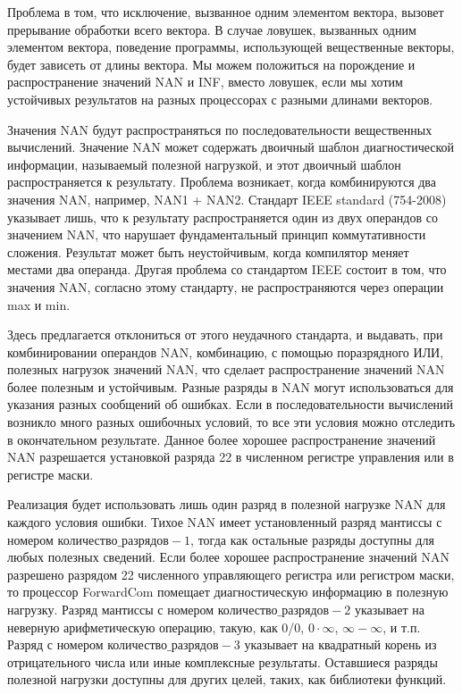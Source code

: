 \documentclass[forwardcom.tex]{subfiles}
\begin{document}
Проблема в том, что исключение, вызванное одним элементом вектора, вызовет прерывание обработки всего вектора. В случае ловушек, вызванных одним элементом вектора, поведение программы, использующей вещественные векторы, будет зависеть от длины вектора. Мы можем положиться на порождение и распространение значений NAN и INF, вместо ловушек, если мы хотим устойчивых результатов на разных процессорах с разными длинами векторов.

\label{nanPropagation}
Значения NAN будут распространяться по последовательности вещественных вычислений. Значение NAN может содержать двоичный шаблон диагностической информации, называемый полезной нагрузкой, и этот двоичный шаблон распространяется к результату. Проблема возникает, когда комбинируются два значения NAN, например, NAN1 + NAN2. Стандарт IEEE standard (754-2008) указывает лишь, что к результату распространяется один из двух операндов со значением NAN, что нарушает фундаментальный принцип коммутативности сложения. Результат может быть неустойчивым, когда компилятор меняет местами два операнда. Другая проблема со стандартом IEEE состоит в том, что значения NAN, согласно этому стандарту, не распространяются через операции max и min.

Здесь предлагается отклониться от этого неудачного стандарта, и выдавать, при комбинировании операндов NAN, комбинацию, с помощью поразрядного ИЛИ, полезных нагрузок значений NAN, что сделает распространение значений NAN более полезным и устойчивым. Разные разряды в NAN могут использоваться для указания разных сообщений об ошибках. Если в последовательности вычислений возникло много разных ошибочных условий, то все эти условия можно отследить в окончательном результате. Данное более хорошее распространение значений NAN разрешается установкой разряда 22 в численном регистре управления или в регистре маски.

Реализация будет использовать лишь один разряд в полезной нагрузке NAN для каждого условия ошибки. Тихое NAN имеет установленный разряд мантиссы с номером $\textit{количество_разрядов}-1$, тогда как остальные разряды доступны для любых полезных сведений. Если более хорошее распространение значений NAN разрешено разрядом 22 численного управляющего регистра или регистром маски, то процессор ForwardCom помещает диагностическую информацию в полезную нагрузку. Разряд мантиссы с номером $\textit{количество_разрядов}-2$ указывает на неверную арифметическую операцию, такую, как 0/0, $0\cdot\infty$, $\infty-\infty$, и т.п. Разряд с номером $\textit{количество_разрядов}-3$ указывает на квадратный корень из отрицательного числа или иные комплексные результаты. Оставшиеся разряды полезной нагрузки доступны для других целей, таких, как библиотеки функций.
\end{document}
